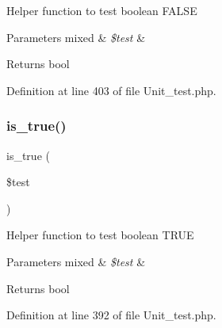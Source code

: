 Helper function to test boolean F\+A\+L\+SE


\begin{DoxyParams}[1]{Parameters}
mixed & {\em \$test} & \\
\hline
\end{DoxyParams}
\begin{DoxyReturn}{Returns}
bool 
\end{DoxyReturn}


Definition at line 403 of file Unit\+\_\+test.\+php.

\mbox{\label{_unit__test_8php_acf75638429e85f5d2eb23c85ce46f85b}} 
\subsubsection{\texorpdfstring{is\_true()}{is\_true()}}
{\footnotesize\ttfamily is\+\_\+true (\begin{DoxyParamCaption}\item[{}]{\$test }\end{DoxyParamCaption})}

Helper function to test boolean T\+R\+UE


\begin{DoxyParams}[1]{Parameters}
mixed & {\em \$test} & \\
\hline
\end{DoxyParams}
\begin{DoxyReturn}{Returns}
bool 
\end{DoxyReturn}


Definition at line 392 of file Unit\+\_\+test.\+php.

